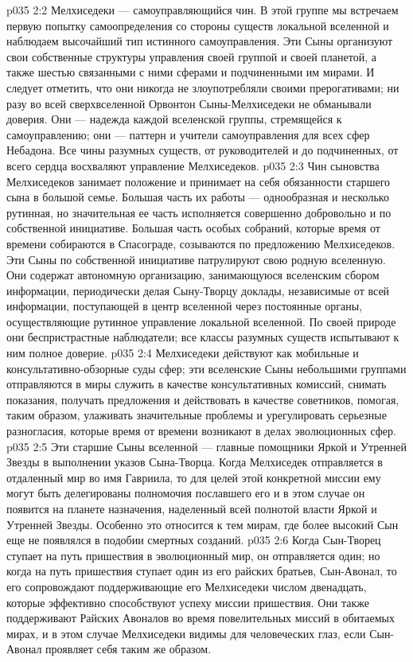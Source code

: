 \vs p035 2:2 Мелхиседеки --- самоуправляющийся чин. В этой группе мы встречаем первую попытку самоопределения со стороны существ локальной вселенной и наблюдаем высочайший тип истинного самоуправления. Эти Сыны организуют свои собственные структуры управления своей группой и своей планетой, а также шестью связанными с ними сферами и подчиненными им мирами. И следует отметить, что они никогда не злоупотребляли своими прерогативами; ни разу во всей сверхвселенной Орвонтон Сыны\hyp{}Мелхиседеки не обманывали доверия. Они --- надежда каждой вселенской группы, стремящейся к самоуправлению; они --- паттерн и учители самоуправления для всех сфер Небадона. Все чины разумных существ, от руководителей и до подчиненных, от всего сердца восхваляют управление Мелхиседеков.
\vs p035 2:3 \pc Чин сыновства Мелхиседеков занимает положение и принимает на себя обязанности старшего сына в большой семье. Большая часть их работы --- однообразная и несколько рутинная, но значительная ее часть исполняется совершенно добровольно и по собственной инициативе. Большая часть особых собраний, которые время от времени собираются в Спасограде, созываются по предложению Мелхиседеков. Эти Сыны по собственной инициативе патрулируют свою родную вселенную. Они содержат автономную организацию, занимающуюся вселенским сбором информации, периодически делая Сыну\hyp{}Творцу доклады, независимые от всей информации, поступающей в центр вселенной через постоянные органы, осуществляющие рутинное управление локальной вселенной. По своей природе они беспристрастные наблюдатели; все классы разумных существ испытывают к ним полное доверие.
\vs p035 2:4 Мелхиседеки действуют как мобильные и консультативно\hyp{}обзорные суды сфер; эти вселенские Сыны небольшими группами отправляются в миры служить в качестве консультативных комиссий, снимать показания, получать предложения и действовать в качестве советников, помогая, таким образом, улаживать значительные проблемы и урегулировать серьезные разногласия, которые время от времени возникают в делах эволюционных сфер.
\vs p035 2:5 Эти старшие Сыны вселенной --- главные помощники Яркой и Утренней Звезды в выполнении указов Сына\hyp{}Творца. Когда Мелхиседек отправляется в отдаленный мир во имя Гавриила, то для целей этой конкретной миссии ему могут быть делегированы полномочия пославшего его и в этом случае он появится на планете назначения, наделенный всей полнотой власти Яркой и Утренней Звезды. Особенно это относится к тем мирам, где более высокий Сын еще не появлялся в подобии смертных созданий.
\vs p035 2:6 Когда Сын\hyp{}Творец ступает на путь пришествия в эволюционный мир, он отправляется один; но когда на путь пришествия ступает один из его райских братьев, Сын\hyp{}Авонал, то его сопровождают поддерживающие его Мелхиседеки числом двенадцать, которые эффективно способствуют успеху миссии пришествия. Они также поддерживают Райских Авоналов во время повелительных миссий в обитаемых мирах, и в этом случае Мелхиседеки видимы для человеческих глаз, если Сын\hyp{}Авонал проявляет себя таким же образом.
